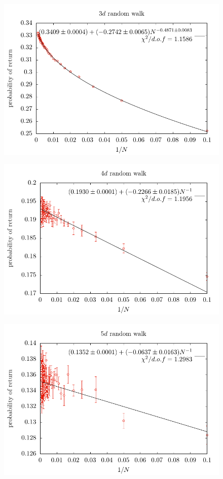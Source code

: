 \documentclass[12pt,a4paper]{article}
\begin{document}
\begin{center}
\begin{figure}
\includegraphics[scale=1]{3d_random_walk.pdf}
\end{figure}
\end{center}


\begin{center}
\begin{figure}
\includegraphics[scale=1]{4d_random_walk.pdf}
\end{figure}
\end{center}


\begin{center}
\begin{figure}
\includegraphics[scale=1]{5d_random_walk.pdf}
\end{figure}
\end{center}
\end{document}

